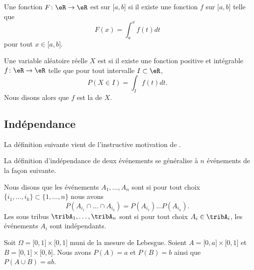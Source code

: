 \begin{definition}      \label{DefAbsoluCont}
    Une fonction \( F\colon \eR\to \eR\) est  sur \( \mathopen[ a , b \mathclose]\) si il existe une fonction \( f\) sur \( \mathopen[ a , b \mathclose]\) telle que
    \begin{equation}
        F(x)=\int_a^xf(t)dt
    \end{equation}
    pour tout \( x\in\mathopen[ a , b \mathclose]\).

    Une variable aléatoire réelle \( X\) est  si il existe une fonction positive et intégrable \( f\colon \eR\to \eR\) telle que pour tout intervalle \( I\subset\eR\),
    \begin{equation}
        P(X\in I)=\int_If(t)dt.
    \end{equation}
    Nous disons alors que \( f\) est la  de \( X\).
\end{definition}


\subsection{Indépendance}

La définition suivante vient de l'instructive motivation de \cite{CourgGudRennes}.


La définition d'indépendance de deux événements se généralise à \( n\) événements de la façon suivante.
\begin{definition}
    Nous disons que les événements \( A_1,\ldots,A_n\) sont  si pour tout choix \( \{ i_1,\ldots,i_k \}\subset\{ 1,\ldots,n \}\) nous avons
    \begin{equation}
        P(A_{i_1}\cap\ldots\cap A_{i_k})=P(A_{i_1})\ldots P(A_{i_k}).
    \end{equation}
    Les sous tribus \( \tribA_1,\ldots,\tribA_n\) sont  si pour tout choix \( A_i\in \tribA_i\), les événements \( A_i\) sont indépendants.
\end{definition}

\begin{example}
    Soit \( \Omega=\mathopen[ 0 , 1 \mathclose]\times \mathopen[ 0 , 1 \mathclose]\) muni de la mesure de Lebesgue. Soient \( A=\mathopen[ 0 , a \mathclose]\times \mathopen[ 0 , 1 \mathclose]\) et \( B=\mathopen[ 0 , 1 \mathclose]\times \mathopen[ 0 , b \mathclose]\). Nous avons \( P(A)=a\) et \( P(B)=b\) ainsi que \( P(A\cup B)=ab\).
\end{example}

